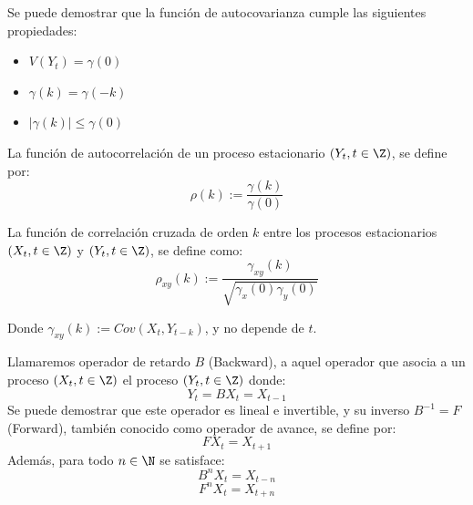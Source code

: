 \documentclass[12pt,oneside]{book}\usepackage[]{graphicx}\usepackage[]{color}
\theoremstyle{definition} %
\begin{document}
Se puede demostrar que la función de autocovarianza cumple las siguientes propiedades:

\begin{itemize}
\item $V(Y_t)=\gamma(0)$
\item $\gamma(k) =  \gamma(-k) $
\item $|\gamma(k)| \leq  \gamma(0) $

\end{itemize}
 

\begin{definicion}
La función de autocorrelación de un proceso estacionario $(Y_t, t\in \Z)$, se define por:
$$\rho(k):=\frac{\gamma(k)}{\gamma(0)}$$
\end{definicion}





\begin{definicion}
La función de correlación cruzada de orden $k$ entre los procesos estacionarios $(X_t, t\in \Z)$ y $(Y_t, t\in \Z)$, se define como:
$$\rho_{xy}(k):=\frac{\gamma_{xy}(k)}{\sqrt{\gamma_x(0) \gamma_y(0) }}$$

Donde $\gamma_{xy}(k):=Cov(X_t,Y_{t-k})$, y no depende de $t$.

\end{definicion}









\begin{definicion}
Llamaremos operador de retardo $B$ (Backward), a aquel operador que asocia a un proceso $(X_t,t\in\Z)$ el proceso $(Y_t,t\in\Z)$ donde:
$$Y_t = BX_t=X_{t-1}$$
Se puede demostrar que este operador es lineal e invertible, y su inverso $B^{-1}=F$ (Forward), también conocido como operador de avance, se define por:
$$F X_t = X_{t+1}$$
Además, para todo $n\in \N$ se satisface:
$$B^n X_t = X_{t-n}$$
$$F^n X_t = X_{t+n}$$
\end{definicion}
\end{document}
